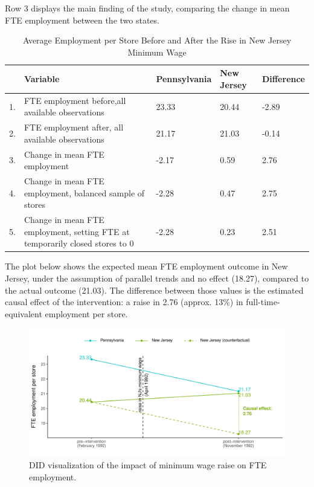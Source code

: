 \documentclass[11pt]{article}
\begin{document}
Row 3 displays the main finding of the study, comparing the change in mean FTE employment between the two states.

\begin{table}[H]
\centering
\renewcommand{\arraystretch}{1.2}
\begin{tabular}{|lp{6cm}|l|l|l|}
  \hline
 & Variable & Pennsylvania & New Jersey & Difference \\ 
  \hline
1. & FTE employment before,\newline all available observations & 23.33 & 20.44 & -2.89 \\ 
  2. & FTE employment after, \newline all available observations & 21.17 & 21.03 & -0.14 \\ 
  3. & Change in mean FTE employment & -2.17 & 0.59 & 2.76 \\ 
  4. & Change in mean FTE employment, balanced sample of stores & -2.28 & 0.47 & 2.75 \\ 
  5. & Change in mean FTE employment, setting FTE at temporarily closed stores to 0 & -2.28 & 0.23 & 2.51 \\ 
   \hline
\end{tabular}
\captionsetup{justification=centering}
\caption{Average Employment per Store Before and After the Rise in New Jersey Minimum Wage} 
\label{tab:indCC}
\end{table}


The plot below shows the expected mean FTE employment outcome in New Jersey, under the assumption of parallel trends and no effect (18.27), compared to the actual outcome (21.03). The difference between those values is the estimated causal effect of the intervention: a raise in 2.76 (approx. 13\%) in full-time-equivalent employment per store. 


\begin{figure}[H]
    \centering
        \includegraphics[scale=.6]{figures/fte_did.pdf}
    \caption{DID visualization of the impact of minimum wage raise on FTE employment.}
    \label{fig:1}
\end{figure}
\end{document}
